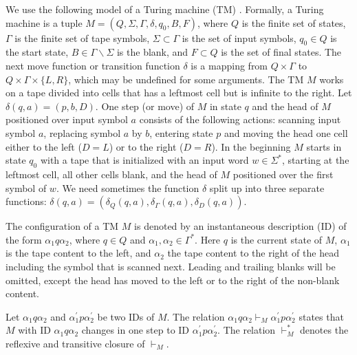 \documentclass[pre,amssymb,showpacs,showkeys,preprint]{revtex4}
\begin{document}
We use the following model of a Turing machine (TM) \cite{hopcroft}.
Formally, a Turing machine is a tuple
$M = (Q, \Sigma, \Gamma, \delta, q_0, B, F)$,
where $Q$ is the finite set of states, $\Gamma$ is the finite set of tape symbols,
$\Sigma \subset \Gamma$ is the set of input symbols, $q_0 \in Q$ is the start state,
$B \in \Gamma \backslash \Sigma$ is the blank, and $F \subset Q$ is the set of final states.
The next move function or transition function $\delta$ is a mapping from
$Q \times \Gamma$ to $Q \times \Gamma \times \{L, R\}$, which may be undefined for some arguments.
The TM $M$ works on a tape divided into cells that has a leftmost cell but is infinite to the right.
Let $\delta(q, a) = (p, b, D)$.
One step (or move) of $M$ in state $q$ and the head of $M$ positioned over input symbol $a$
consists of the following actions:
scanning input symbol $a$, replacing symbol $a$ by $b$,
entering state $p$ and moving the head one cell either to the left ($D=L$) or to the right ($D=R$).
In the beginning $M$ starts in state $q_0$ with a tape that is initialized with an input word $w \in \Sigma^*$,
starting at the leftmost cell, all other cells blank,
and the head of $M$ positioned over the first symbol of $w$.
We need sometimes the function $\delta$ split up into three separate functions:
$\delta(q,a) = (\delta_Q(q,a), \delta_\Gamma(q,a), \delta_D(q,a))$.

The configuration of a TM $M$ is denoted by an instantaneous description (ID) of the form
$\alpha_1 q \alpha_2$, where $q \in Q$ and $\alpha_1, \alpha_2 \in \Gamma^*$.
Here $q$ is the current state of $M$, $\alpha_1$ is the tape content to the left,
and $\alpha_2$ the tape content to the right of the head including the symbol that is scanned next.
Leading and trailing blanks will be omitted, except the head has moved to the left or to the right of
the non-blank content.

Let $\alpha_1 q \alpha_2$ and  $\alpha_1^\prime p \alpha_2^\prime$ be two IDs of $M$.
The relation $\alpha_1 q \alpha_2 \vdash_M \alpha_1^\prime p \alpha_2^\prime$ states
that $M$ with ID $\alpha_1 q \alpha_2$ changes in one step
to ID $\alpha_1^\prime p \alpha_2^\prime$.
The relation $\vdash_M^*$ denotes the reflexive and transitive closure of $\vdash_M$.
\end{document}
